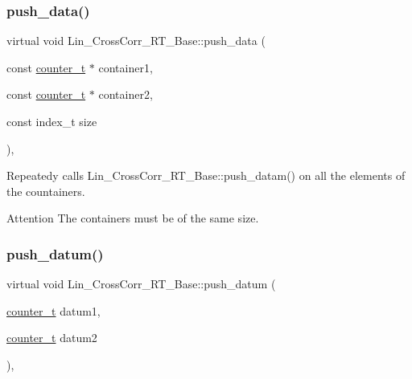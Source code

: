\mbox{\label{classLin__CrossCorr__RT__Base_a48faa93c6766605436fd8399949beb11}} 
\subsubsection{\texorpdfstring{push\+\_\+data()}{push\_data()}}
{\footnotesize\ttfamily virtual void Lin\+\_\+\+Cross\+Corr\+\_\+\+R\+T\+\_\+\+Base\+::push\+\_\+data (\begin{DoxyParamCaption}\item[{const \hyperlink{types_8hpp_a22f279793847eba127de149437848c48}{counter\+\_\+t} $\ast$}]{container1,  }\item[{const \hyperlink{types_8hpp_a22f279793847eba127de149437848c48}{counter\+\_\+t} $\ast$}]{container2,  }\item[{const index\+\_\+t}]{size }\end{DoxyParamCaption})\hspace{0.3cm}{\ttfamily [inline]}, {}}



Repeatedy calls {\ttfamily Lin\+\_\+\+Cross\+Corr\+\_\+\+R\+T\+\_\+\+Base\+::push\+\_\+datam()} on all the elements of the countainers. 

\begin{DoxyAttention}{Attention}
The containers must be of the same size. 
\end{DoxyAttention}
\mbox{\label{classLin__CrossCorr__RT__Base_abdc90b5ab6a5f7ac98e97b3d16261834}} 
\subsubsection{\texorpdfstring{push\+\_\+datum()}{push\_datum()}}
{\footnotesize\ttfamily virtual void Lin\+\_\+\+Cross\+Corr\+\_\+\+R\+T\+\_\+\+Base\+::push\+\_\+datum (\begin{DoxyParamCaption}\item[{\hyperlink{types_8hpp_a22f279793847eba127de149437848c48}{counter\+\_\+t}}]{datum1,  }\item[{\hyperlink{types_8hpp_a22f279793847eba127de149437848c48}{counter\+\_\+t}}]{datum2 }\end{DoxyParamCaption})\hspace{0.3cm}{\ttfamily [inline]}, {}}



